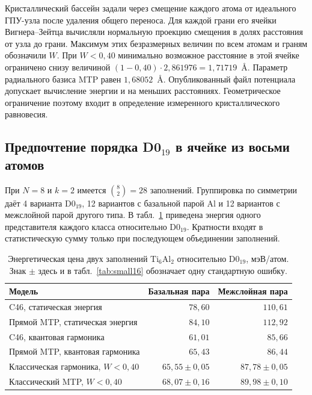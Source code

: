 \documentclass[11pt,a4paper]{article}
\begin{document}
Кристаллический бассейн задали через смещение каждого атома от идеального
ГПУ-узла после удаления общего переноса. Для каждой грани его ячейки
Вигнера--Зейтца вычисляли нормальную проекцию смещения в долях расстояния
от узла до грани. Максимум этих безразмерных величин по всем атомам и
граням обозначили $W$. При $W<0{,}40$ минимально возможное расстояние в
этой ячейке ограничено снизу величиной
$(1-0{,}40)\cdot 2{,}861976 = 1{,}71719$~\AA. Параметр радиального базиса
MTP равен $1{,}68052$~\AA. Опубликованный файл потенциала допускает
вычисление энергии и на меньших расстояниях. Геометрическое ограничение
поэтому входит в определение измеренного кристаллического равновесия.

\subsection{Предпочтение порядка \texorpdfstring{D0$_{19}$}{D0₁₉} в ячейке из восьми атомов}

При $N=8$ и $k=2$ имеется $\binom82=28$ заполнений. Группировка по симметрии
даёт 4 варианта D0$_{19}$, 12 вариантов с базальной парой Al и 12 вариантов
с межслойной парой другого типа. В табл.~\ref{tab:small8} приведена энергия
одного представителя каждого класса относительно D0$_{19}$. Кратности входят
в статистическую сумму только при последующем объединении заполнений.

\begin{table}[htbp]
\centering\small
\caption{Энергетическая цена двух заполнений $\mathrm{Ti}_6\mathrm{Al}_2$
относительно D0$_{19}$, мэВ/атом. Знак $\pm$ здесь и в
табл.~\ref{tab:small16} обозначает одну стандартную ошибку.}
\label{tab:small8}
\begin{tabular}{@{}lrr@{}}
\toprule
Модель & Базальная пара & Межслойная пара\\
\midrule
C46, статическая энергия & $78{,}60$ & $110{,}61$\\
Прямой MTP, статическая энергия & $84{,}10$ & $112{,}92$\\
C46, квантовая гармоника & $61{,}01$ & $85{,}66$\\
Прямой MTP, квантовая гармоника & $65{,}43$ & $86{,}44$\\
Классическая гармоника, $W<0{,}40$ & $65{,}55\pm0{,}05$ & $87{,}78\pm0{,}05$\\
Классический MTP, $W<0{,}40$ & $68{,}07\pm0{,}16$ & $89{,}98\pm0{,}10$\\
\bottomrule
\end{tabular}
\end{table}
\end{document}
